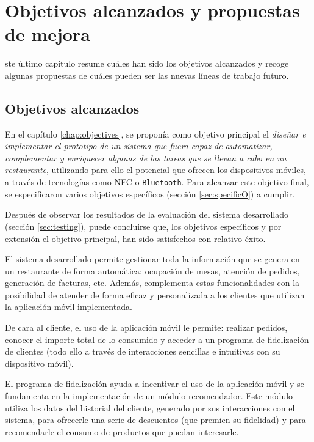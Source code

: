 
\chapter{Objetivos alcanzados y propuestas de mejora}
ste último capítulo resume cuáles han sido los objetivos alcanzados
y recoge algunas propuestas de cuáles pueden ser las nuevas líneas de trabajo 
futuro.

\section{Objetivos alcanzados}
En el capítulo \ref{chap:objectives}, se proponía como objetivo principal el
\emph{diseñar e implementar el prototipo de un sistema que fuera capaz de 
automatizar, complementar y enriquecer algunas de las tareas que se llevan a 
cabo en un restaurante}, utilizando para ello el potencial que ofrecen los
dispositivos móviles, a través de tecnologías como \acs{NFC} o
\texttt{Bluetooth}. Para alcanzar este objetivo final, se especificaron varios
objetivos específicos (sección \ref{sec:specificO}) a cumplir.

Después de observar los resultados de la evaluación del sistema desarrollado
(sección \ref{sec:testing}), puede concluirse que, los objetivos específicos y 
por extensión el objetivo principal, han sido satisfechos con relativo éxito.

El sistema desarrollado permite gestionar toda la información que se genera en
un restaurante de forma automática: ocupación de mesas, atención de pedidos, 
generación de facturas, etc. Además, complementa estas funcionalidades con la
posibilidad de atender de forma eficaz y personalizada a los clientes que
utilizan la aplicación móvil implementada.

De cara al cliente, el uso de la aplicación móvil le permite: realizar pedidos, 
conocer el importe total de lo consumido y acceder a un programa de
fidelización de clientes (todo ello a través de interacciones sencillas e
intuitivas con su dispositivo móvil).

El programa de fidelización ayuda a incentivar el uso de la
aplicación móvil y se fundamenta en la implementación de un módulo 
recomendador. Este módulo utiliza los datos del historial del cliente, generado 
por sus interacciones con el sistema, para ofrecerle una serie de descuentos
(que premien su fidelidad) y para recomendarle el consumo de productos que 
puedan interesarle.

